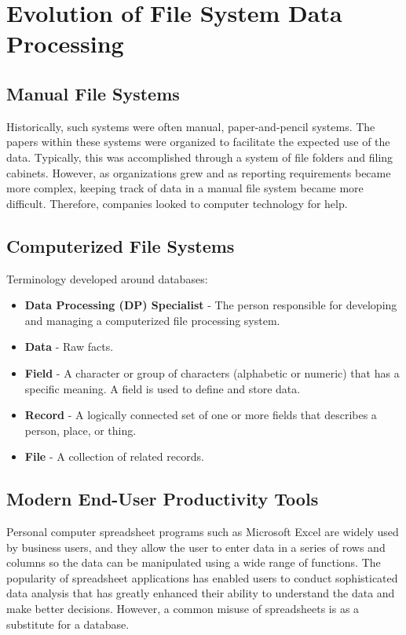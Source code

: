 \documentclass[a4paper, 12pt, titlepage]{report}
\begin{document}
\section{Evolution of File System Data Processing}
\subsection{Manual File Systems}
Historically, such systems were often manual, paper-and-pencil systems. The papers within these systems were organized to facilitate the expected use of the data. Typically, this was accomplished through a system of file folders and filing cabinets.
However, as organizations grew and as reporting requirements became more complex, keeping track of data in a manual file system became more difficult. Therefore, companies looked to computer technology for help.
\subsection{Computerized File Systems}
Terminology developed around databases:
\begin{itemize}
\item \textbf{Data Processing (DP) Specialist} - The person responsible for developing and managing a computerized file processing system.
\item \textbf{Data} - Raw facts.
\item \textbf{Field} - A character or group of characters (alphabetic or numeric) that has a specific meaning. A field is used to define and store data.
\item \textbf{Record} - A logically connected set of one or more fields that describes a person, place, or thing.
\item \textbf{File} - A collection of related records.
\end{itemize}
\subsection{Modern End-User Productivity Tools}
Personal computer spreadsheet programs such as Microsoft Excel are widely used by business users, and they allow the user to enter data in a series of rows and columns so the data can be manipulated using a wide range of functions. The popularity of spreadsheet applications has enabled users to conduct sophisticated data analysis that has greatly enhanced their ability to understand the data and make better decisions. However, a common misuse of spreadsheets is as a substitute for a database.
\end{document}
